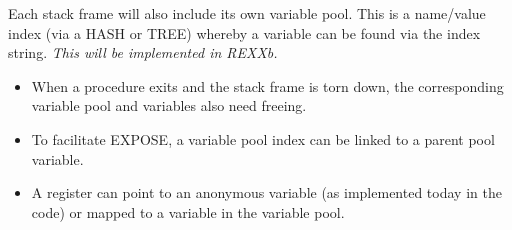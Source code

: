 Each stack frame will also include its own variable pool. This is a
name/value index (via a HASH or TREE) whereby a variable can be found
via the index string. \emph{This will be implemented in REXXb.}

\begin{itemize}
\tightlist
\item
  When a procedure exits and the stack frame is torn down, the
  corresponding variable pool and variables also need freeing.
\item
  To facilitate EXPOSE, a variable pool index can be linked to a parent
  pool variable.
\item
  A register can point to an anonymous variable (as implemented today in
  the code) or mapped to a variable in the variable pool.
\end{itemize}
